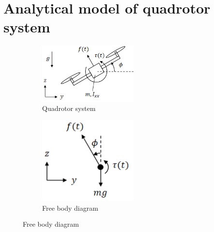 \documentclass[12pt]{article}
\begin{document}
\section*{Analytical model of quadrotor system}
\begin{figure}[h!]
    \begin{subfigure}[t]{0.5\textwidth}
        \centering
        \includegraphics[width=5cm]{figures/model_diagram.png}
        \caption{Quadrotor system \cite{model_diagram}}
        \label{fig:1a}
    \end{subfigure}
    \hfill
    \begin{subfigure}[t]{0.5\textwidth}
        \centering
        \includegraphics[width=5cm]{figures/free_body_diagram.png}
        \caption{Free body diagram \cite{model_diagram}}
        \label{fig:1b}
    \end{subfigure}
\end{figure}
\end{document}
